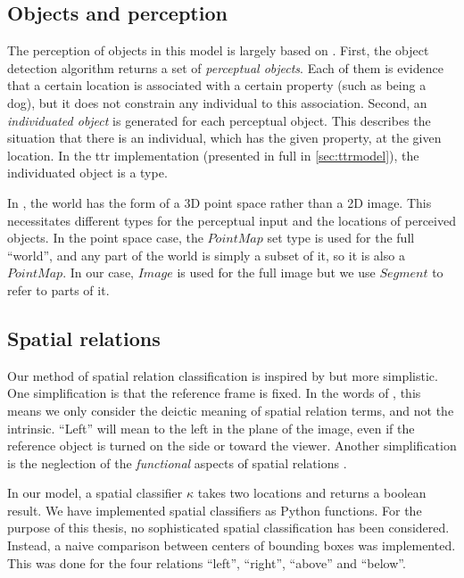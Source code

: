 \subsection{Objects and perception}

The perception of objects in this model is largely based on \cite{lspc}.
First, the object detection algorithm returns a set of \textit{perceptual objects}.
Each of them is evidence that a certain location is associated with a certain property (such as being a dog), but it does not constrain any individual to this association.
Second, an \textit{individuated object} is generated for each perceptual object.
This describes the situation that there is an individual, which has the given property, at the given location.
In the \gls{ttr} implementation (presented in full in \autoref{sec:ttrmodel}), the individuated object is a type.

In \cite{lspc}, the world has the form of a 3D point space rather than a 2D image.
This necessitates different types for the perceptual input and the locations of perceived objects.
In the point space case, the $PointMap$ set type is used for the full ``world'', and any part of the world is simply a subset of it, so it is also a $PointMap$.
In our case, $Image$ is used for the full image but we use $Segment$ to refer to parts of it.



\subsection{Spatial relations}
\label{sec:method-spatrel}

Our method of spatial relation classification is inspired by \cite{ttrspat} but more simplistic.
One simplification is that the reference frame is fixed.
In the words of \cite{Garnhamunifiedtheorymeaning1989}, this means we only consider the deictic meaning of spatial relation terms, and not the intrinsic.
``Left'' will mean to the left in the plane of the image, even if the reference object is turned on the side or toward the viewer.
Another simplification is the neglection of the \textit{functional} aspects of spatial relations \citep{CoventryInterplayGeometryFunction2001}.

In our model, a spatial classifier $\kappa$ takes two locations and returns a boolean result.
We have implemented spatial classifiers as Python functions.
For the purpose of this thesis, no sophisticated spatial classification has been considered.
Instead, a naive comparison between centers of bounding boxes was implemented.
This was done for the four relations ``left'', ``right'', ``above'' and ``below''.



